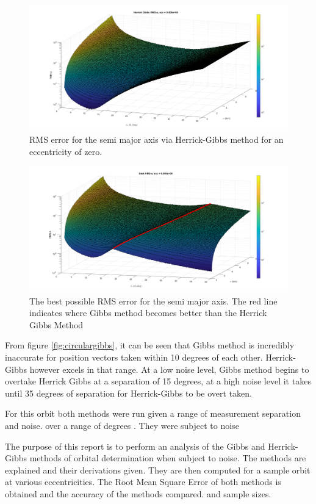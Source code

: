 \documentclass[12pt]{article}
\begin{document}
	\begin{figure}
		\centering
		\includegraphics[width=0.7\linewidth]{circularHerrickGibbs}
		\caption{RMS error for the semi major axis via Herrick-Gibbs method for an eccentricity of zero.}
		\label{fig:circularherrickgibbs}
	\end{figure}
\begin{figure}
	\centering
	\includegraphics[width=0.7\linewidth]{bestMethodsCirc}
	\caption{The best possible RMS error for the semi major axis. The red line indicates where Gibbs method becomes better than the Herrick Gibbs Method}
	\label{fig:bestmethodscirc}
\end{figure}

	From figure \ref{fig:circulargibbs}, it can be seen that Gibbs method is incredibly inaccurate for position vectors taken within 10 degrees of each other. Herrick-Gibbs however excels in that range. At a low noise level, Gibbs method begins to overtake Herrick Gibbs at a separation of 15 degrees, at a high noise level it takes until 35 degrees of separation for Herrick-Gibbs to be overt taken.
	
	\iffalse
	
	
	For this orbit both methods were run given a range of measurement separation and noise.  over a range of degrees . They were subject to noise
	
	The purpose of this report is to perform an analysis of the Gibbs and Herrick-Gibbs methods of orbital determination when subject to noise. The methods are explained and their derivations given. They are then computed for a sample orbit at various eccentricities. The Root Mean Square Error of both methods is obtained and the accuracy of the methods compared.   and sample sizes. 
	
\end{document}
